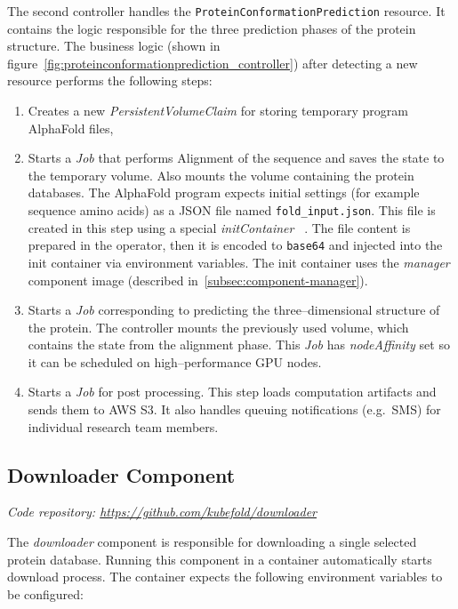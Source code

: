 The second controller handles the \texttt{ProteinConformationPrediction} resource.
It contains the logic responsible for the three prediction phases of the protein structure.
The business logic (shown in figure~\ref{fig:proteinconformationprediction_controller}) after detecting a new resource performs the following steps:
\begin{enumerate}
    \item Creates a new \textit{PersistentVolumeClaim} for storing temporary program AlphaFold files,
    \item Starts a \textit{Job} that performs Alignment of the sequence and saves the state to the temporary volume.
    Also mounts the volume containing the protein databases.
    The AlphaFold program expects initial settings (for example sequence amino acids) as a JSON file named \texttt{fold\_input.json}.
    This file is created in this step using a special \textit{initContainer} ~\cite{k8s_init_containers}.
    The file content is prepared in the operator, then it is encoded to \texttt{base64} and injected into the init container via environment variables.
    The init container uses the \textit{manager} component image (described in~\ref{subsec:component-manager}).
    \item Starts a \textit{Job} corresponding to predicting the three--dimensional structure of the protein.
    The controller mounts the previously used volume, which contains the state from the alignment phase.
    This \textit{Job} has \textit{nodeAffinity} set so it can be scheduled on high--performance GPU nodes.
    \item Starts a \textit{Job} for post processing.
    This step loads computation artifacts and sends them to AWS S3. It also handles queuing notifications (e.g.\     SMS) for individual research team members.
\end{enumerate}

\subsection{Downloader Component}\label{subsec:component-downloader}
\textit{Code repository: \url{https://github.com/kubefold/downloader}}

The \textit{downloader} component is responsible for downloading a single selected protein database.
Running this component in a container automatically starts download process.
The container expects the following environment variables to be configured:

